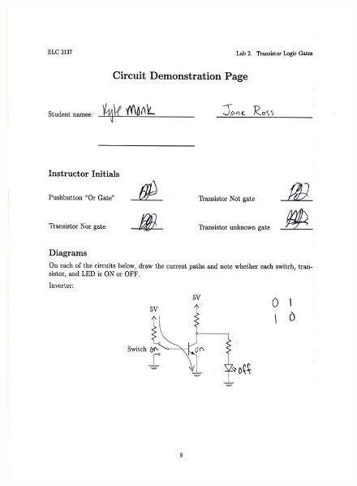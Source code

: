 \documentclass[11pt]{article}
\begin{document}
	\begin{figure}
		\centering
		\includegraphics[page=1,width=\textwidth]{"lab 2 results"}
		\label{fig:lab-2-results1}
	\end{figure}
	
\end{document}
